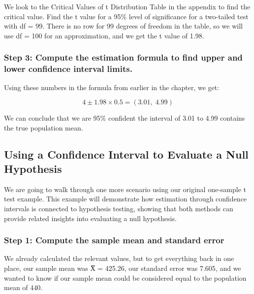\documentclass[
  letterpaper,
  DIV=11,
  numbers=noendperiod]{scrreprt}
\begin{document}
We look to the Critical Values of t Distribution Table in the appendix
to find the critical value. Find the t value for a 95\% level of
significance for a two-tailed test with df = 99. There is no row for 99
degrees of freedom in the table, so we will use df = 100 for an
approximation, and we get the t value of 1.98.

\subsubsection*{Step 3: Compute the estimation formula to find upper and
lower confidence interval
limits.}\label{step-3-compute-the-estimation-formula-to-find-upper-and-lower-confidence-interval-limits.}

Using these numbers in the formula from earlier in the chapter, we get:

\[
4 \pm 1.98 \times 0.5 = (3.01,\; 4.99)
\]

We can conclude that we are 95\% confident the interval of 3.01 to 4.99
contains the true population mean.

\subsection{Using a Confidence Interval to Evaluate a Null
Hypothesis}\label{using-a-confidence-interval-to-evaluate-a-null-hypothesis}

We are going to walk through one more scenario using our original
one-sample t test example. This example will demonstrate how estimation
through confidence intervals is connected to hypothesis testing, showing
that both methods can provide related insights into evaluating a null
hypothesis.

\subsubsection*{Step 1: Compute the sample mean and standard
error}\label{step-1-compute-the-sample-mean-and-standard-error-1}

We already calculated the relevant values, but to get everything back in
one place, our sample mean was X̅ = 425.26, our standard error was 7.605,
and we wanted to know if our sample mean could be considered equal to
the population mean of 440.
\end{document}
